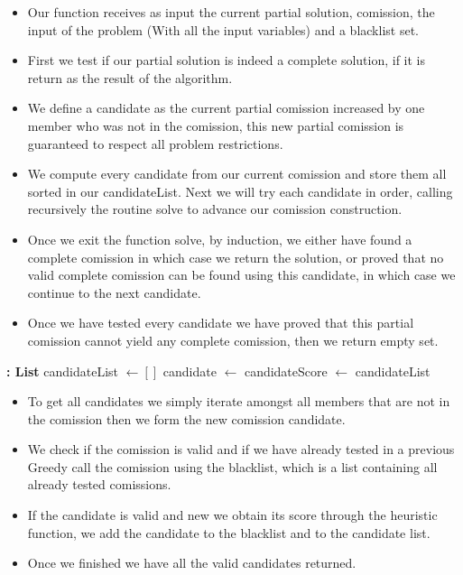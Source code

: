 \documentclass{article}
\begin{document}
\begin{itemize}
  \item Our function receives as input the current partial solution, comission, the input of the problem (With all the input variables) and a blacklist set.
  \item First we test if our partial solution is indeed a complete solution, if it is return as the result of the algorithm.
  \item We define a candidate as the current partial comission increased by one member who was not in the comission, this new partial comission is guaranteed to respect all problem restrictions.
  \item We compute every candidate from our current comission and store them all sorted in our candidateList. Next we will try each candidate in order, calling recursively the routine solve to advance our comission construction.
  \item Once we exit the function solve, by induction, we either have found a complete comission in which case we return the solution, or proved that no valid complete comission can be found using this candidate, in which case we continue to the next candidate.
  \item Once we have tested every candidate we have proved that this partial comission cannot yield any complete comission, then we return empty set.
\end{itemize}

\begin{algorithm}[H]
\begin{algorithmic}[1]
 \textbf{: List}
    \State candidateList $\gets []$
        \State candidate $\gets$ 
            \State candidateScore $\gets$ 
            \State {}
            \State {}
        \EndIf
    \EndFor
    \State {}
    \State \Return candidateList
\EndFunction
\end{algorithmic}
\end{algorithm}

\begin{itemize}
  \item To get all candidates we simply iterate amongst all members that are not in the comission then we form the new comission candidate. 
  \item We check if the comission is valid and if we have already tested in a previous Greedy call the comission using the blacklist, which is a list containing all already tested comissions.
  \item If the candidate is valid and new we obtain its score through the heuristic function, we add the candidate to the blacklist and to the candidate list.
  \item Once we finished we have all the valid candidates returned.
\end{itemize}
\end{document}
